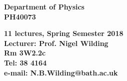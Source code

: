 \documentclass[a4paper,10pt]{slides}
\begin{document}
\setlength{\parskip}{2ex}
\setlength{\parindent}{0ex}
\setlength{\baselineskip}{3ex}


\begin{slide}
\begin{center}
{\bf  Department of Physics}\\
{\bf PH40073}\\[1cm]
\end{center}


\begin{center}
\begin{large}
{\bf \Large 11 lectures, Spring Semester 2018}\\[1cm] 
{\bf Lecturer: Prof. Nigel Wilding\\[1mm] Rm 3W2.2c\\[1mm] Tel: 38 4164\\[1mm]
e-mail: N.B.Wilding@bath.ac.uk\\[3mm]

} 
\end{large}
\end{center}

\end{slide}
\end{document}
